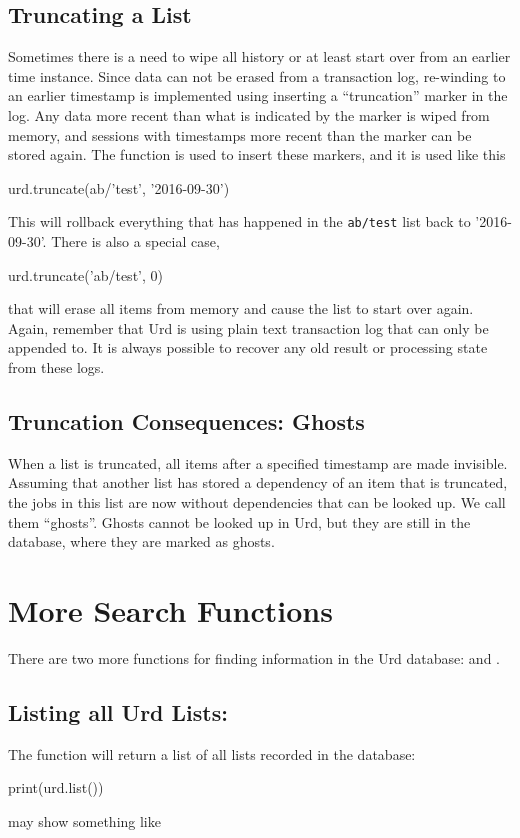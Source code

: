 \subsection{Truncating a List}
Sometimes there is a need to wipe all history or at least start over
from an earlier time instance.  Since data can not be erased from a
transaction log, re-winding to an earlier timestamp is implemented
using inserting a ``truncation'' marker in the log.  Any data more
recent than what is indicated by the marker is wiped from memory, and
sessions with timestamps more recent than the marker can be stored
again.  The  function is used to insert these
markers, and it is used like this
\begin{python}
urd.truncate(ab/'test', '2016-09-30')
\end{python}
This will rollback everything that has happened in
the \texttt{ab/test} list back to '2016-09-30'.  There is also a
special case,
\begin{python}
urd.truncate('ab/test', 0)
\end{python}
that will erase all items from memory and cause the list to start over
again.  Again, remember that Urd is using plain text transaction log
that can only be appended to.  It is always possible to recover any
old result or processing state from these logs.



\subsection{Truncation Consequences:  Ghosts}
When a list is truncated, all items after a specified timestamp are
made invisible.  Assuming that another list has stored a dependency of
an item that is truncated, the jobs in this list are now without
dependencies that can be looked up.  We call them ``ghosts''.  Ghosts
cannot be looked up in Urd, but they are still in the database, where
they are marked as ghosts.





\section{More Search Functions}
\label{sec:more_urd_search}

There are two more functions for finding information in the Urd
database:  and .



\subsection{Listing all Urd Lists:  }
The  function will return a list of all lists recorded in
the database:
\begin{python}
print(urd.list())
\end{python}
may show something like
\begin{shell}
\end{shell}



